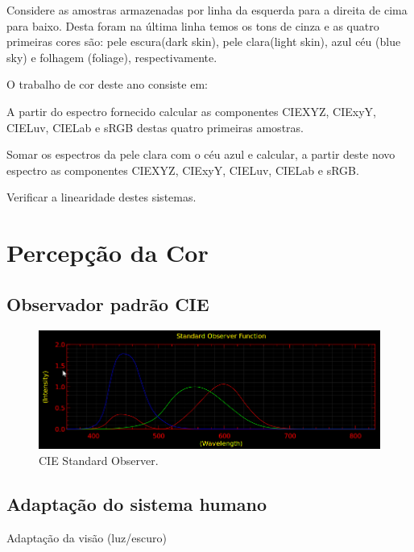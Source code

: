 \documentclass[a4paper,10pt]{report}
\begin{document}
\par
Considere as amostras armazenadas por linha da esquerda para a direita de cima
para baixo.  Desta foram na última linha temos os tons de cinza e as quatro
primeiras cores são: pele escura(dark skin), pele clara(light skin), azul céu
(blue sky) e folhagem (foliage), respectivamente.  

\par
O trabalho de cor deste ano consiste em:
\begin{list}{:~}{}
\item A partir do espectro fornecido calcular as componentes CIEXYZ,
CIExyY, CIELuv, CIELab e sRGB destas quatro primeiras amostras.
\item Somar os espectros da pele clara com o céu azul e calcular, a partir deste
novo espectro as componentes CIEXYZ, CIExyY, CIELuv, CIELab e sRGB.
\item Verificar a linearidade destes sistemas.
\end{list}

\section{Percepção da Cor}
\subsection{Observador padrão CIE}
\begin{figure}[!htb]
     \centering
     \includegraphics[scale=1.0]{img/cie_std_observer.png}
     \caption{CIE Standard Observer.}
     \label{Label de referência para a imagem}
\end{figure}

\subsection{Adaptação do sistema humano}
\par
Adaptação da visão (luz/escuro)
\end{document}
